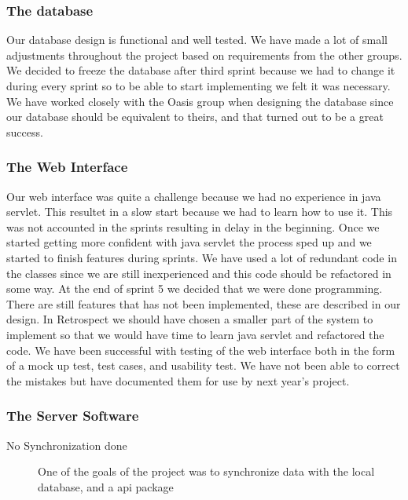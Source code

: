 \subsubsection*{The database}
Our database design is functional and well tested. We have made a lot of small adjustments throughout the project based on requirements from the other groups. We decided to freeze the database after third sprint because we had to change it during every sprint so to be able to start implementing we felt it was necessary. We have worked closely with the Oasis group when designing the database since our database should be equivalent to theirs, and that turned out to be a great success.

\subsubsection*{The Web Interface}
Our web interface was quite a challenge because we had no experience in java servlet. This resultet in a slow start because we had to learn how to use it. This was not accounted in the sprints resulting in delay in the beginning. Once we started getting more confident with java servlet the process sped up and we started to finish features during sprints.
We have used a lot of redundant code in the classes since we are still inexperienced and this code should be refactored in some way. At the end of sprint 5 we decided that we were done programming. There are still features that has not been implemented, these are described in our design.
In Retrospect we should have chosen a smaller part of the system to implement so that we would have time to learn java servlet and refactored the code. We have been successful with testing of the web interface both in the form of a mock up test, test cases, and usability test.
We have not been able to correct the mistakes but have documented them for use by next year's project.

\subsubsection*{The Server Software}
\begin{description}
 \item[No Synchronization done] One of the goals of the project was to synchronize data with the local database, and a api package 
\end{description}


